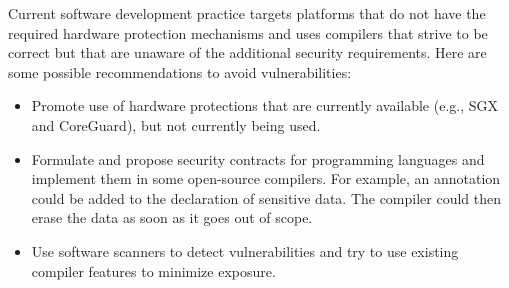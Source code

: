 Current software development practice targets platforms that do not have the required hardware protection mechanisms and uses compilers that strive to be correct but that are unaware of the additional security requirements. Here are some possible recommendations to avoid vulnerabilities:
\begin{itemize}
	\item Promote use of hardware protections that are currently available (e.g., SGX and CoreGuard), but not currently being used.
	\item Formulate and propose security contracts for programming languages and implement them in some open-source compilers. For example, an annotation could be added to the declaration of sensitive data. The compiler could then erase the data as soon as it goes out of scope.
	\item Use software scanners to detect vulnerabilities and try to use existing compiler features to minimize exposure.
\end{itemize}

